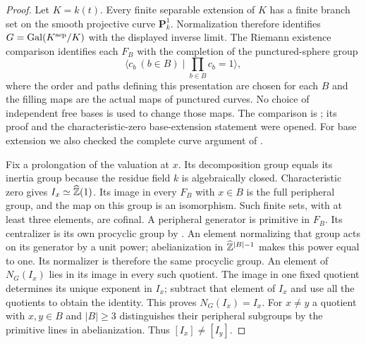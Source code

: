 \begin{proof}
Let $K=k(t)$.  Every finite separable extension of $K$ has a finite
branch set on the smooth projective curve $\mathbf P^1_k$.
Normalization therefore identifies
$G=\operatorname{Gal}(K^{\mathrm{sep}}/K)$ with the displayed inverse limit.
The Riemann existence comparison identifies each $F_B$ with the
completion of the punctured-sphere group
\[
 \langle c_b\ (b\in B)\mid\prod_{b\in B}c_b=1\rangle,
\]
where the order and paths defining this presentation are chosen for
each $B$ and the filling maps are the actual maps of punctured curves.
No choice of independent free bases is used to change those maps.
The comparison is \cite[Theorem 21.3]{Milne2013}; its proof and the
characteristic-zero base-extension statement were opened.
For base extension we also checked the complete curve argument of
\cite[Proposition 2.10, with Lemmas 2.3, 2.6 and 2.9]{Landesman2024}.

Fix a prolongation of the valuation at $x$.  Its decomposition group
equals its inertia group because the residue field $k$ is algebraically
closed.  Characteristic zero gives
$I_x\simeq\widehat{\mathbb Z}(1)$.  Its image in every $F_B$ with $x\in B$
is the full peripheral group, and the map on this group is an
isomorphism.  Such finite sets, with at least three elements, are
cofinal.  A peripheral generator is primitive in $F_B$.  Its
centralizer is its own procyclic group by
\cite[Corollary 2.3]{BuxErshovRapinchuk2011}.  An element normalizing
that group acts on its generator by a unit power; abelianization in
$\widehat{\mathbb Z}^{|B|-1}$ makes this power equal to one.  Its normalizer
is therefore the same procyclic group.  An element of $N_G(I_x)$
lies in its image in every such quotient.  The image in one fixed
quotient determines its unique exponent in $I_x$; subtract that
element of $I_x$ and use all the quotients to obtain the identity.
This proves $N_G(I_x)=I_x$.  For $x\ne y$ a quotient with
$x,y\in B$ and $|B|\geq3$ distinguishes their peripheral subgroups
by the primitive lines in abelianization.  Thus $[I_x]\ne[I_y]$.


\end{proof}
